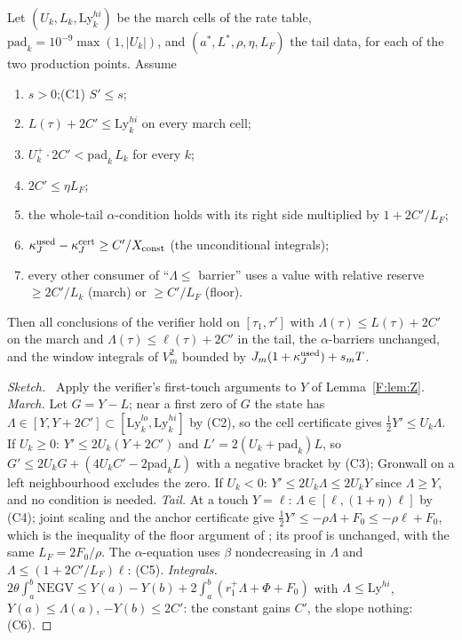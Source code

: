 \documentclass[11pt]{article}
\newcommand{\fn}[1]{\texttt{\detokenize{#1}}}
\begin{document}
\begin{proposition}\label{F:prop:abs}
Let $(U_k,L_k,\mathrm{Ly}^{hi}_k)$ be the march cells of the rate table, $\mathrm{pad}_k=10^{-9}\max(1,|U_k|)$, and $(a^*,L^*,\rho,\eta,L_F)$ the tail data, for each of the two production points. Assume
\begin{enumerate}[label=(C\arabic*),leftmargin=3em,start=0]
\item $s>0$;\quad \textup{(C1)} $S'\le s$;
\setcounter{enumi}{1}
\item $L(\tau)+2C'\le\mathrm{Ly}^{hi}_k$ on every march cell;
\item $U_k^+\cdot2C'<\mathrm{pad}_k\,L_k$ for every $k$;
\item $2C'\le\eta L_F$;
\item the whole-tail $\alpha$-condition holds with its right side multiplied by $1+2C'/L_F$;
\item $\kappa_J^{\rm used}-\kappa_J^{\rm cert}\ge C'/X_{\rm const}$ (the unconditional integrals);
\item every other consumer of ``$\Lambda\le$ barrier'' uses a value with relative reserve $\ge2C'/L_k$ (march) or $\ge C'/L_F$ (floor).
\end{enumerate}
Then all conclusions of the verifier \fn{fin13v4b} hold on $[\tau_1,\tau']$ with $\Lambda(\tau)\le L(\tau)+2C'$ on the march and $\Lambda(\tau)\le\ell(\tau)+2C'$ in the tail, the $\alpha$-barriers unchanged, and the window integrals of $V_m^2$ bounded by $J_m(1+\kappa_J^{\rm used})+s_mT$.
\end{proposition}
\begin{proof}[Sketch]\tH\ Apply the verifier's first-touch arguments to $Y$ of Lemma~\ref{F:lem:Z}. \emph{March.} Let $G=Y-L$; near a first zero of $G$ the state has $\Lambda\in[Y,Y+2C']\subset[\mathrm{Ly}^{lo}_k,\mathrm{Ly}^{hi}_k]$ by (C2), so the cell certificate gives $\frac12Y'\le U_k\Lambda$. If $U_k\ge0$: $Y'\le2U_k(Y+2C')$ and $L'=2(U_k+\mathrm{pad}_k)L$, so $G'\le2U_kG+(4U_kC'-2\mathrm{pad}_kL)$ with a negative bracket by (C3); Gronwall on a left neighbourhood excludes the zero. If $U_k<0$: $Y'\le2U_k\Lambda\le2U_kY$ since $\Lambda\ge Y$, and no condition is needed. \emph{Tail.} At a touch $Y=\ell$: $\Lambda\in[\ell,(1+\eta)\ell]$ by (C4); joint scaling and the anchor certificate give $\frac12Y'\le-\rho\Lambda+F_0\le-\rho\ell+F_0$, which is the inequality of the floor argument of \fn{TAIL_LEMMA.tex}; its proof is unchanged, with the same $L_F=2F_0/\rho$. The $\alpha$-equation uses $\beta$ nondecreasing in $\Lambda$ and $\Lambda\le(1+2C'/L_F)\ell$: (C5). \emph{Integrals.} $2\theta\int_a^b\mathrm{NEGV}\le Y(a)-Y(b)+2\int_a^b(r_1^+\Lambda+\Phi+F_0)$ with $\Lambda\le\mathrm{Ly}^{hi}$, $Y(a)\le\Lambda(a)$, $-Y(b)\le2C'$: the constant gains $C'$, the slope nothing: (C6).
\end{proof}
\end{document}
